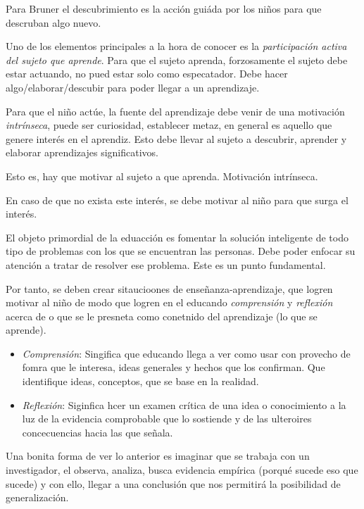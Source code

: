 \documentclass[12pt]{report}
\newcounter{it}
\theoremstyle{largebreak}
\begin{document}
\begin{enumerate}
        Para Bruner el descubrimiento es la acción guiáda por los niños para que descruban algo nuevo.

        Uno de los elementos principales a la hora de conocer es la \textit{participación activa del sujeto que aprende}. Para que el sujeto aprenda, forzosamente el sujeto debe estar actuando, no pued estar solo como especatador. Debe hacer algo/elaborar/descubir para poder llegar a un aprendizaje.

        Para que el niño actúe, la fuente del aprendizaje debe venir de una motivación \textit{intrínseca}, puede ser curiosidad, establecer metaz, en general es aquello que genere interés en el aprendiz. Esto debe llevar al sujeto a descubrir, aprender y elaborar aprendizajes significativos.

        Esto es, hay que motivar al sujeto a que aprenda. Motivación intrínseca.

        En caso de que no exista este interés, se debe motivar al niño para que surga el interés.

        El objeto primordial de la eduacción es fomentar la solución inteligente de todo tipo de problemas con los que se encuentran las personas. Debe poder enfocar su atención a tratar de resolver ese problema. Este es un punto fundamental.

        Por tanto, se deben crear sitaucioones de enseñanza-aprendizaje, que logren motivar al niño de modo que logren en el educando \textit{comprensión} y \textit{reflexión} acerca de o que se le presneta como conetnido del aprendizaje (lo que se aprende).

        \begin{itemize}
            \item \textit{Comprensión}: Singifica que educando llega a ver como usar con provecho de fomra que le interesa, ideas generales y hechos que los confirman. Que identifique ideas, conceptos, que se base en la realidad.
            \item \textit{Reflexión}: Siginfica hcer un examen crítica de una idea o conocimiento a la luz de la evidencia comprobable que lo sostiende y de las ulteroires concecuencias hacia las que señala.
        \end{itemize}
        Una bonita forma de ver lo anterior es imaginar que se trabaja con un investigador, el observa, analiza, busca evidencia empírica (porqué sucede eso que sucede) y con ello, llegar a una conclusión que nos permitirá la posibilidad de generalización.
    \end{enumerate}
\end{document}
